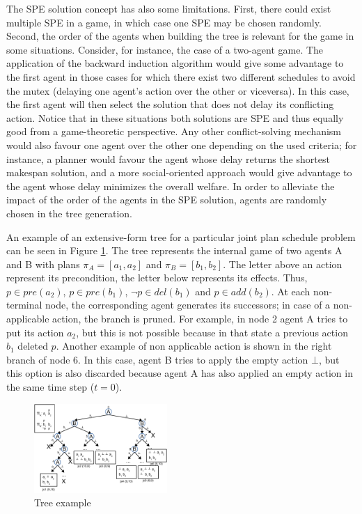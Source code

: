 \documentclass[letterpaper]{article}
\begin{document}
The SPE solution concept has also some limitations. First, there could exist multiple SPE in a game, in which case one SPE may be chosen randomly. Second, the order of the agents when building the tree is relevant for the game in some situations. Consider, for instance, the case of a two-agent game. The application of the backward induction algorithm would give some advantage to the first agent in those cases for which there exist two different schedules to avoid the mutex (delaying one agent's action over the other or viceversa). In this case, the first agent will then select the solution that does not delay its conflicting action. Notice that in these situations both solutions are SPE and thus equally good from a game-theoretic perspective. Any other conflict-solving mechanism would also favour one agent over the other one depending on the used criteria; for instance, a planner would favour the agent whose delay returns the shortest makespan solution, and a more social-oriented approach would give advantage to the agent whose delay minimizes the overall welfare. In order to alleviate the impact of the order of the agents in the SPE solution, agents are randomly chosen in the tree generation.


An example of an extensive-form tree for a particular joint plan schedule problem can be seen in Figure \ref{fig:tree}. The tree represents the internal game of two agents A and B with plans $\pi_A=[a_1, a_2]$ and $\pi_B=[b_1, b_2]$. The letter above an action represent its precondition, the letter below represents its effects. Thus, $p \in pre(a_2)$, $p \in pre(b_1)$, $\neg p \in del(b_1)$ and $p \in add(b_2)$. At each non-terminal node, the corresponding agent generates its successors; in case of a non-applicable action, the branch is pruned. For example, in node 2 agent A tries to put its action $a_2$, but this is not possible because in that state a previous action $b_1$ deleted $p$. Another example of non applicable action is shown in the right branch of node 6. In this case, agent B tries to apply the empty action $\bot$, but this option is also discarded because agent A has also applied an empty action in the same time step ($t=0$).


\begin{figure}
\centering
\includegraphics[width=0.45\textwidth]{tree}
\caption{Tree example}
\label{fig:tree}
\end{figure}
\end{document}
